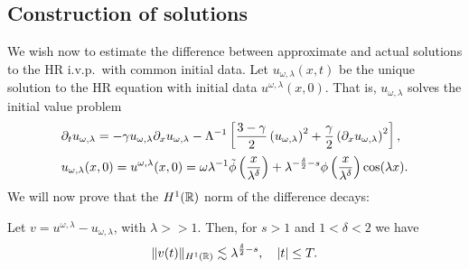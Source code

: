 \subsection{Construction of solutions}
We wish now to estimate the difference between approximate and actual 
solutions to
the HR i.v.p.\ with common initial data. Let
$u_{\omega,\lambda}(x,t)$ be the unique solution to the HR equation
with initial data $u^{\omega,\lambda}(x,0)$. That is,
$u_{\omega,\lambda}$ solves the initial value problem
\begin{align}
& \partial_t u_{\omega,\lambda} = - \gamma u_{\omega,\lambda} \partial_x 
u_{\omega,\lambda} - \Lambda^{-1} \left[
\frac{3- \gamma}{2}\left( u_{\omega,\lambda} \right)^2 + 
\frac{\gamma}{2}\left(
\partial_x u_{\omega,\lambda} \right)^2
\right], \label{apple50}
\\
& u_{\omega,\lambda}(x, 0) = u^{\omega,\lambda}(x,0) = \omega \lambda^{-1}
\tilde{\phi} \left( \frac{x}{\lambda^\delta} \right)
+ \lambda^{-\frac{\delta}{2} -s}
\phi\left( \frac{x}{\lambda^\delta} \right) \cos(\lambda x).
\label{apple41}
\end{align}
%
%
%
We will now prove that the $H^1(\mathbb{R})$ norm of the difference decays: 
%
%
%
%
%
%
%
%
%
%
%
%
%
%
%
\begin{proposition}
\label{applelem:bound_for_difference-of-approx-and-actual-soln}
%
Let $v = u^{\omega,\lambda} - u_{\omega,\lambda}$, with $\lambda >>1$.
Then, for $s > 1$ and $1<\delta<2$ we have
%
%
\begin{equation} \|
v(t)
\|_{H^1(\mathbb{R})}
\lesssim \lambda^{\frac{\delta}{2} -s}, \quad
|t| \le T.
\end{equation}
%
%
\end{proposition}
%
%
